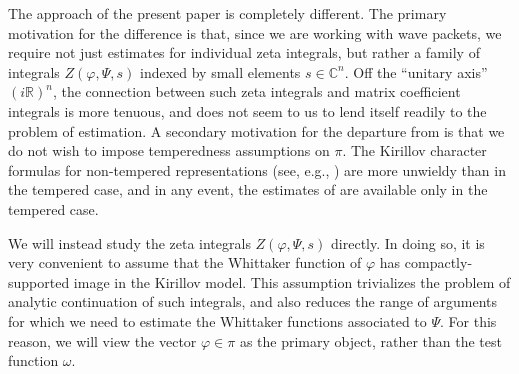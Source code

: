 The approach of the present paper is completely different.  The primary motivation for the difference is that, since we are working with wave packets, we require not just estimates for individual zeta integrals, but rather a family of integrals $Z(\varphi, \Psi, s)$ indexed by small elements $s \in \mathbb{C}^n$.  Off the ``unitary axis'' $(i \mathbb{R})^n$, the connection between such zeta integrals and matrix coefficient integrals is more tenuous, and does not seem to us to lend itself readily to the problem of estimation.  A secondary motivation for the departure from \cite{2020arXiv201202187N} is that we do not wish to impose temperedness assumptions on $\pi$.  The Kirillov character formulas for non-tempered representations (see, e.g., \cite{MR4131117}) are more unwieldy than in the tempered case, and in any event, the estimates of \cite[\S19]{nelson-venkatesh-1} are available only in the tempered case.

We will instead study the zeta integrals $Z(\varphi,\Psi,s)$ directly.  In doing so, it is very convenient to assume that the Whittaker function of $\varphi$ has compactly-supported image in the Kirillov model.  This assumption trivializes the problem of analytic continuation of such integrals, and also reduces the range of arguments for which we need to estimate the Whittaker functions associated to $\Psi$.  For this reason, we will view the vector $\varphi \in \pi$ as the primary object, rather than the test function $\omega$.

